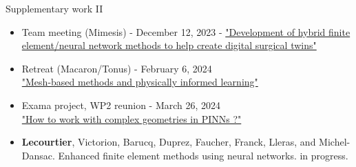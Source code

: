\begin{frame}{Supplementary work II}
	\small
	\vspace{-10pt}
	
	\begin{tcolorbox}[
		skin=bicolor,
		colback=other, %
		colbacklower=other!20!white,
		title={Talks},
		arc=2mm, %
		boxrule=0.5pt, %
		breakable, enhanced jigsaw,
		width=\linewidth,
		opacityback=0.1
		]
		
		\begin{itemize}[\textcolor{other}{$\blacktriangleright$}]
			\item Team meeting (Mimesis) - December 12, 2023 - \href{https://flecourtier.github.io/these2023/these2023/1.0.3/_attachments/presentation/2023_12_12.pdf}{"Development of hybrid finite element/neural network methods to help create digital surgical twins"}
			\item Retreat (Macaron/Tonus) - February 6, 2024 \\
			\href{https://flecourtier.github.io/these2023/these2023/1.0.3/_attachments/presentation/2024_02_06.pdf}{"Mesh-based methods and physically informed learning"}
			\item Exama project, WP2 reunion - March 26, 2024 \\
			\href{https://flecourtier.github.io/these2023/these2023/1.0.3/_attachments/presentation/2024_03_26.pdf}{"How to work with complex geometries in PINNs ?"}
		\end{itemize}
	\end{tcolorbox}

	\vspace{-7pt}

	\begin{tcolorbox}[
		skin=bicolor,
		colback=other, %
		colbacklower=other!20!white,
		title={Publications},
		arc=2mm, %
		boxrule=0.5pt, %
		breakable, enhanced jigsaw,
		width=\linewidth,
		opacityback=0.1
		]
		
		\begin{itemize}[\textcolor{other}{$\blacktriangleright$}]
			\item \textbf{Lecourtier}, Victorion, Barucq, Duprez, Faucher, Franck, Lleras, and Michel-Dansac. Enhanced finite element methods
			using neural networks. in progress.
		\end{itemize}
	\end{tcolorbox}


\end{frame}

